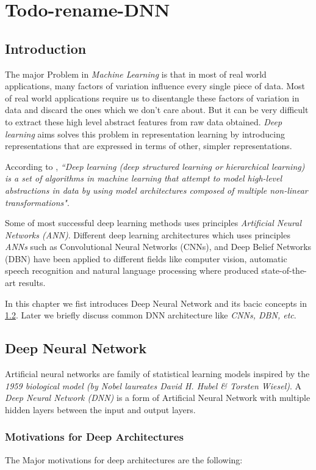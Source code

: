 \chapter{Todo-rename-DNN}
\label{chap:dnn}
\section{Introduction}
The major Problem in \textit{Machine Learning} is that in most of real world applications, many factors of variation influence every single piece of data. Most of real world applications require us to disentangle these factors of variation in data and discard the ones which we don't care about. But it can be very difficult to extract these high level abstract features from raw data obtained. \textit{Deep learning} aims solves this problem in representation learning by introducing representations that are expressed in terms of other, simpler representations.

According to \cite{deng2014deep}, \textit{``Deep learning (deep structured learning or hierarchical learning) is a set of algorithms in machine learning that attempt to model high-level abstractions in data by using model architectures composed of multiple non-linear transformations"}.

Some of most successful deep learning methods uses principles \textit{Artificial Neural Networks (ANN)}. Different deep learning architectures which uses principles \textit{ANNs} such as Convolutional Neural Networks (CNNs), and Deep Belief Networks (DBN) have been applied to different  fields like computer vision, automatic speech recognition and  natural language processing where produced state-of-the-art results.

In this chapter we fist introduces Deep Neural Network and its bacic concepts in \ref{sec:dnn:dnn}. Later we briefly discuss common DNN architecture like \textit{CNNs, DBN, etc}.

\section{Deep Neural Network}
\label{sec:dnn:dnn}
Artificial neural networks are family of statistical learning models inspired by the \textit{1959 biological model (by Nobel laureates David H. Hubel \& Torsten Wiesel)}. A \textit{Deep Neural Network (DNN)} is a form of  Artificial Neural Network with multiple hidden layers between the input and output layers. 


\subsection{Motivations for Deep Architectures}
The Major motivations for deep architectures are the following:

